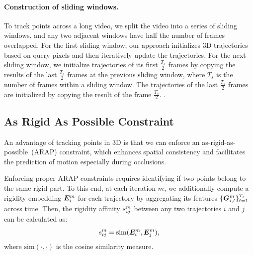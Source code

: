 \paragraph{Construction of sliding windows.}
To track points across a long video, we split the video into a series of sliding windows, and any two adjacent windows have half the number of frames overlapped.
For the first sliding window, our approach initializes 3D trajectories based on query pixels and then iteratively update the trajectories.
For the next sliding window, we initialize trajectories of its first $\frac{T_s}{2}$ frames by copying the results of the last $\frac{T_s}{2}$ frames at the previous sliding window, where $T_s$ is the number of frames within a sliding window.
The trajectories of the last $\frac{T_s}{2}$ frames are initialized by copying the result of the frame $\frac{T_s}{2}$.
.

\fi



\subsection{As Rigid As Possible Constraint}
\label{sec:arap}


An advantage of tracking points in 3D is that we can enforce an as-rigid-as-possible~(ARAP) constraint, which enhances spatial consistency and facilitates the prediction of motion especially during occlusions.

Enforcing proper ARAP constraints requires identifying if two points belong to the same rigid part.
To this end, at each iteration $m$, we additionally compute a rigidity embedding $\bm{E}_i^m$ for each trajectory by aggregating its features $\{\bm{G}_{i,t}^m\}_{t=1}^{T_s}$ across time. Then, the rigidity affinity $s^m_{ij}$ between any two trajectories $i$ and $j$ can be calculated as:
\begin{equation}
    s^m_{ij} = \text{sim}(\bm{E}_i^m, \bm{E}_j^m),
\end{equation}
where $\text{sim}(\cdot, \cdot)$ is the cosine similarity measure.


